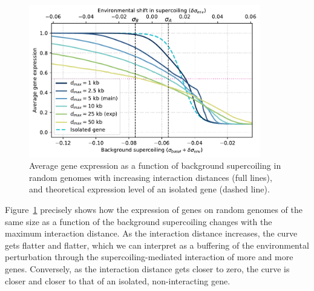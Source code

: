 \begin{figure}[H]
\centering
\includegraphics[width=0.9\textwidth]{param/interaction-25k/random_activ_per_sigma.pdf}
\caption[Average gene expression as a function of background supercoiling, with increasing interaction distances, in random genomes]{Average gene expression as a function of background supercoiling in random genomes with increasing interaction distances (full lines), and theoretical expression level of an isolated gene (dashed line).}
\label{fig:param:inter25k-random-activ-by-sigma}
\end{figure}

Figure~\ref{fig:param:inter25k-random-activ-by-sigma} precisely shows how the expression of genes on random genomes of the same size as a function of the background supercoiling changes with the maximum interaction distance.
As the interaction distance increases, the curve gets flatter and flatter, which we can interpret as a buffering of the environmental perturbation through the supercoiling-mediated interaction of more and more genes.
Conversely, as the interaction distance gets closer to zero, the curve is closer and closer to that of an isolated, non-interacting gene.

